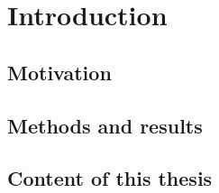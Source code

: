 \chapter{Introduction}
\section{Motivation}
\section{Methods and results}
\section{Content of this thesis}
\clearpage{\pagestyle{empty}\cleardoublepage}
